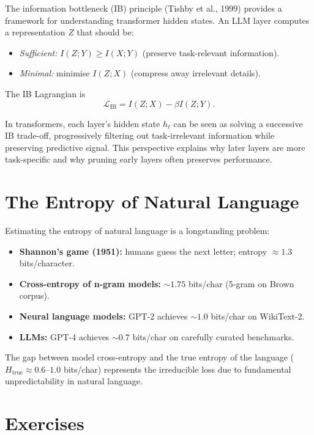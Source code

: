 \documentclass[11pt,a4paper]{book}
\theoremstyle{definition}
\begin{document}
The information bottleneck (IB) principle (Tishby et al., 1999) provides a framework for understanding transformer hidden states. An LLM layer computes a representation $Z$ that should be:
\begin{itemize}
	\item \emph{Sufficient:} $I(Z; Y) \geq I(X; Y)$ (preserve task-relevant information).
	\item \emph{Minimal:} minimise $I(Z; X)$ (compress away irrelevant details).
\end{itemize}

The IB Lagrangian is
\begin{equation}
	\mathcal{L}_{\mathrm{IB}} = I(Z; X) - \beta I(Z; Y).
\end{equation}

In transformers, each layer's hidden state $h_\ell$ can be seen as solving a successive IB trade-off, progressively filtering out task-irrelevant information while preserving predictive signal. This perspective explains why later layers are more task-specific and why pruning early layers often preserves performance.

\section{The Entropy of Natural Language}

Estimating the entropy of natural language is a longstanding problem:

\begin{itemize}
	\item \textbf{Shannon's game (1951):} humans guess the next letter; entropy $\approx 1.3$ bits/character.
	\item \textbf{Cross-entropy of n-gram models:} $\sim 1.75$ bits/char (5-gram on Brown corpus).
	\item \textbf{Neural language models:} GPT-2 achieves $\sim 1.0$ bits/char on WikiText-2.
	\item \textbf{LLMs:} GPT-4 achieves $\sim 0.7$ bits/char on carefully curated benchmarks.
\end{itemize}

The gap between model cross-entropy and the true entropy of the language ($H_\text{true} \approx 0.6$--$1.0$ bits/char) represents the irreducible loss due to fundamental unpredictability in natural language.

\section{Exercises}
\end{document}
